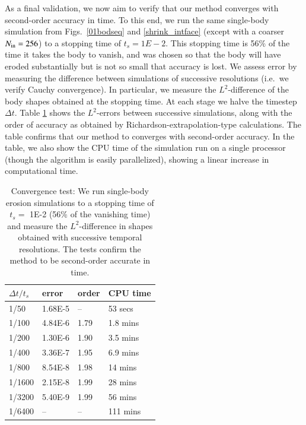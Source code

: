 \documentclass[preprint, 10pt]{elsarticle}
\begin{document}
As a final validation, we now aim to verify that our method converges with second-order accuracy in time. To this end, we run the same single-body simulation from Figs.~\ref{01bodseq} and \ref{shrink_intface} (except with a coarser $N_{\mathrm{in}}=256$) to a stopping time of $t_s = 1E-2$. This stopping time is 56\% of the time it takes the body to vanish, and was chosen so that the body will have eroded substantially but is not so small that accuracy is lost. We assess error by measuring the difference between simulations of successive resolutions (i.e.~we verify Cauchy convergence). In particular, we measure the $L^2$-difference of the body shapes obtained at the stopping time. At each stage we halve the timestep $\Delta t$. Table \ref{convtab} shows the $L^2$-errors between successive simulations, along with the order of accuracy as obtained by Richardson-extrapolation-type calculations. The table confirms that our method to converges with second-order accuracy. In the table, we also show the CPU time of the simulation run on a single processor (though the algorithm is easily parallelized), showing a linear increase in computational time.

\begin{table}%
\begin{center}
\caption{Convergence test: We run single-body erosion simulations to a stopping time of $t_s =$ 1E-2 (56\% of the vanishing time) and measure the $L^2$-difference in shapes obtained with successive temporal resolutions. The tests confirm the method to be second-order accurate in time.
}
\vspace{0.3 pc}
\label{convtab}
\begin{tabular}{l l l l}
\hline
\hspace{0.0pc} $\Delta t/t_s$
\hspace{0.5pc} & error 
\hspace{0.5pc} & order
\hspace{0.5pc} & CPU time \\
\hline
%
1/50		& 1.68E-5		& --		& 53 secs     	\\
1/100	& 4.84E-6		& 1.79	& 1.8 mins   	\\
1/200	& 1.30E-6		& 1.90	& 3.5 mins  	\\
1/400	& 3.36E-7		& 1.95	& 6.9 mins  	\\
1/800	& 8.54E-8		& 1.98	& 14 mins   	\\
1/1600	& 2.15E-8		& 1.99	& 28 mins  	\\
1/3200	& 5.40E-9		& 1.99	& 56 mins    	\\
1/6400	& --			& --		& 111 mins	\\
%
\hline
\end{tabular}
\end{center}
\end{table}
\end{document}
